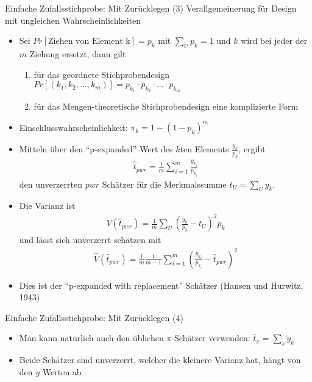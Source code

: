 \documentclass[9pt]{beamer}
\begin{document}
\begin{frame}{Einfache Zufallsstichprobe: Mit Zurücklegen (3)}
Verallgemeinerung für Design mit ungleichen Wahrscheinlichkeiten
\begin{itemize}
\item Sei $Pr[\text{Ziehen von Element k}]=p_k$ mit $\sum_U p_k =1$ und $k$ wird bei jeder der $m$ Ziehung ersetzt, dann gilt 
\begin{enumerate}
\item für das geordnete Stichprobendesign
$Pr[(k_1,k_2,...,k_m)] = p_{k_1}\cdot p_{k_2} \cdot ... \cdot p_{k_m}$
\item für das Mengen-theoretische Stichprobendesign eine komplizierte Form
\end{enumerate}
\item Einschlusswahrscheinlichkeit: $\pi_k = 1-(1-p_k)^m$
\item Mitteln über den \enquote{p-expanded} Wert des $k$ten Elements $\frac{y_k}{p_k}$, ergibt \small
\begin{align*}
\hat{t}_{pwr} = \frac{1}{m} \sum_{i=1}^{m} \frac{y_{k_i}}{p_{k_i}}
\end{align*}\normalsize
den unverzerrten $pwr$ Schätzer für die Merkmalssumme $t_U = \sum_U y_k$.
\item Die Varianz ist \small
\begin{align*}
V(\hat{t}_{pwr}) = \frac{1}{m} \sum_U \left(\frac{y_k}{p_k}-t_U\right)^2 p_k
\end{align*}\normalsize
und lässt sich unverzerrt schätzen mit\small
\begin{align*}
\hat{V}(\hat{t}_{pwr}) = \frac{1}{m} \frac{1}{m-1}\sum_{i=1}^m \left(\frac{y_{k_i}}{p_{k_i}}-\hat{t}_{pwr}\right)^2
\end{align*}	\normalsize
\item Dies ist der \enquote{p-expanded with replacement} Schätzer (Hansen und Hurwitz, 1943) 
\end{itemize}
\end{frame}

\begin{frame}{Einfache Zufallsstichprobe: Mit Zurücklegen (4)}
\begin{itemize}
\item Man kann natürlich auch den üblichen $\pi$-Schätzer verwenden: $\hat{t}_\pi = \sum_s \check{y}_k$
\item Beide Schätzer sind unverzerrt, welcher die kleinere Varianz hat, hängt von den $y$ Werten ab
\end{itemize}
\end{frame}
\end{document}
